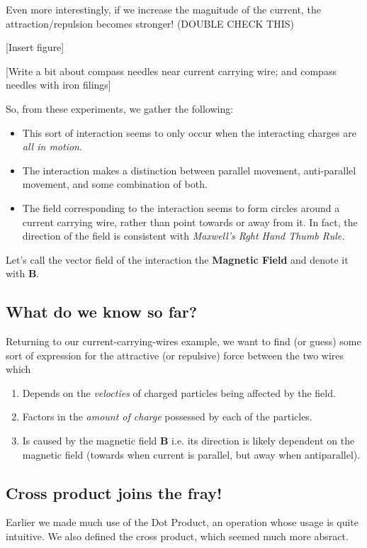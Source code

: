 \documentclass[12pt]{report}
\begin{document}
Even more interestingly, if we increase the magnitude of the current, the attraction/repulsion becomes stronger! (DOUBLE CHECK THIS)

[Insert figure]

[Write a bit about compass needles near current carrying wire; and compass needles with iron filings]

So, from these experiments, we gather the following:
\begin{itemize}
    \item This sort of interaction seems to only occur when the interacting charges are \emph{all in motion}. 
    \item The interaction makes a distinction between parallel movement, anti-parallel movement, and some combination of both.
    \item The field corresponding to the interaction seems to form circles around a current carrying wire, rather than point towards or away from it. In fact, the direction of the field is consistent with \emph{Maxwell's Rght Hand Thumb Rule.}
\end{itemize}

Let's call the vector field of the interaction the \textbf{Magnetic Field} and denote it with $\mathbf{B}$.

\subsection{What do we know so far?}

Returning to our current-carrying-wires example, we want to find (or guess) some sort of expression for the attractive (or repulsive) force between the two wires which
\begin{enumerate}
    \item Depends on the \emph{velocties} of charged particles being affected by the field.
    \item Factors in the \emph{amount of charge} possessed by each of the particles.
    \item Is caused by the magnetic field $\mathbf{B}$ i.e. its direction is likely dependent on the magnetic field (towards when current is parallel, but away when antiparallel).
\end{enumerate}

\subsection{Cross product joins the fray!}
Earlier we made much use of the Dot Product, an operation whose usage is quite intuitive. We also defined the cross product, which seemed much more absract. 
\end{document}
